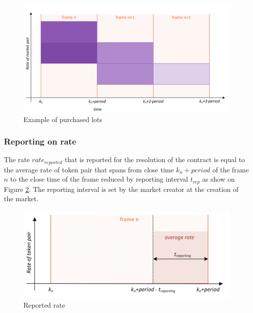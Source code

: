 \documentclass{article}
\begin{document}
	\begin{figure}[h]
		\centering
		\includegraphics[scale=0.5]{images/lotsPurchased.png}
		\caption{Example of purchased lots}
		\label{fig:placedwagers}
	\end{figure}
	
	
	\subsubsection{Reporting on rate} \label{sec:reporting}
	
	The rate $rate_{reported}$ that is reported for the resolution of the contract is equal to the average rate of token pair that spans from close time $k_{n}+period$ of the frame $n$ to the close time of the frame reduced by reporting interval $t_{rep}$ as show on Figure \ref{fig:reportingRate}. The reporting interval is set by the market creator at the creation of the market.
	
	\begin{figure}[h]
		\centering
		\includegraphics[scale=1]{images/reportRate.png}
		\caption{Reported rate}
		\label{fig:reportingRate}
	\end{figure}
	
\end{document}
